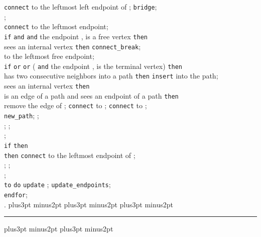 \documentclass[10pt]{article}
\def\yskip{\penalty-50\vskip3pt plus3pt minus2pt}
\def\y{\yskip}
\def\yyy{\yskip\yskip\yskip}
\begin{document}
{\phantom{\tt el}\phantom{\tt el}\phantom{\tt el}\phantom{\tt
el}\phantom{\tt el}\phantom{\tt el} {\tt connect}  to the
leftmost left endpoint of ; {\tt bridge}; \\
\phantom{\tt el}\phantom{\tt el}\phantom{\tt el}\phantom{\tt
el}\phantom{\tt el}\phantom{\tt el} ;\\
\phantom{\tt el}\phantom{\tt el}\phantom{\tt el}\phantom{\tt
el}{\tt else} {\tt connect}  to the leftmost endpoint;\\
\phantom{\tt el} {\tt if}  {\tt and}
 {\tt and}
the endpoint , is a free vertex {\tt then}\\
\phantom{\tt el}\phantom{\tt el}\phantom{\tt el}{\tt if}  sees an internal vertex  {\tt then} {\tt connect\_break};\\
\phantom{\tt el}\phantom{\tt el}\phantom{\tt el}{\tt else connect}  to the leftmost free endpoint;\\
\phantom{\tt el} {\tt if}  {\tt or}
 {\tt or}
( {\tt and}
the endpoint , is the terminal vertex) {\tt then}\\
\phantom{\tt el}\phantom{\tt el}\phantom{\tt el}{\tt if}  has
two consecutive neighbors into a path {\tt then} {\tt insert}  into the path;\\
\phantom{\tt el}\phantom{\tt el}\phantom{\tt el}{\tt else-if}
 sees an internal vertex  {\tt then}\\
\phantom{\tt el}\phantom{\tt el}\phantom{\tt el}\phantom{\tt
el}{\tt if}  is an edge of a path  and  sees an endpoint  of a path  {\tt then} \\
\phantom{\tt el}\phantom{\tt el}\phantom{\tt el}\phantom{\tt
el}\phantom{\tt
el} remove the edge  of ; {\tt connect}  to ; {\tt connect}  to ;\\
\phantom{\tt el}\phantom{\tt el}\phantom{\tt el}\phantom{\tt
el}{\tt else} {\tt new\_path}; ;\\
\phantom{\tt el}\phantom{\tt el}\phantom{\tt el}{\tt else}
;
;\\
\phantom{\tt el}{\tt endif};\\
 {\tt if}  {\tt then}\\
\phantom{\tt el}\phantom{\tt el}{\tt if}
 {\tt then} {\tt connect} 
to the leftmost endpoint of ;\\
\phantom{\tt el}\phantom{\tt el}{\tt else}
;
;\\
\phantom{\tt el}{\tt endif};\\
\phantom{\tt el}{\tt for}  {\tt to}  {\tt do} {\tt update} ;   {\tt update\_endpoints};\\
{\tt endfor};\\
  .
\yyy \hrule \y\y}
\end{document}
